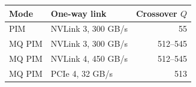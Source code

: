 \begin{tabular}{llr}
\toprule
Mode & One-way link & Crossover $Q$ \\
\midrule
PIM & NVLink 3, 300 GB/s & 55 \\
MQ PIM & NVLink 3, 300 GB/s & 512--545 \\
MQ PIM & NVLink 4, 450 GB/s & 512--545 \\
MQ PIM & PCIe 4, 32 GB/s & 513 \\
\bottomrule
\end{tabular}

